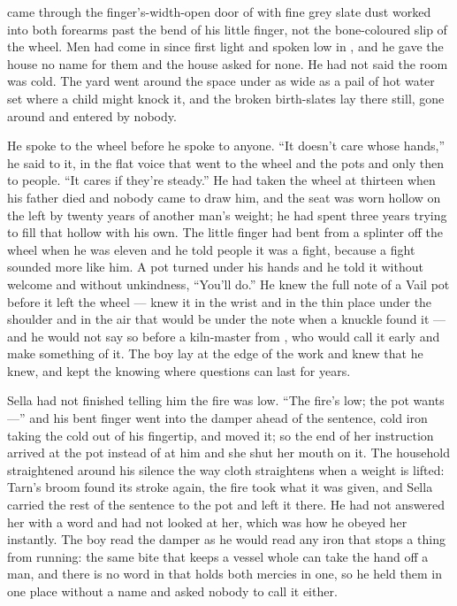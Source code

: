 \scenebreak

 came through the finger’s-width-open door of  with fine grey slate dust worked into both forearms past the bend of his little finger, not the bone-coloured slip of the wheel. Men had come in since first light and spoken low in , and he gave the house no name for them and the house asked for none. He had not said the room was cold. The yard went around the space under  as wide as a pail of hot water set where a child might knock it, and the broken birth-slates lay there still, gone around and entered by nobody.

He spoke to the wheel before he spoke to anyone. “It doesn’t care whose hands,” he said to it, in the flat voice that went to the wheel and the pots and only then to people. “It cares if they’re steady.” He had taken the wheel at thirteen when his father died and nobody came to draw him, and the seat was worn hollow on the left by twenty years of another man’s weight; he had spent three years trying to fill that hollow with his own. The little finger had bent from a splinter off the wheel when he was eleven and he told people it was a fight, because a fight sounded more like him. A pot turned under his hands and he told it without welcome and without unkindness, “You’ll do.” He knew the full note of a Vail pot before it left the wheel — knew it in the wrist and in the thin place under the shoulder and in the air that would be under the note when a knuckle found it — and he would not say so before a kiln-master from , who would call it early and make something of it. The boy lay at the edge of the work and knew that he knew, and kept the knowing where questions can last for years.

Sella had not finished telling him the fire was low. “The fire’s low; the pot wants ---” and his bent finger went into the damper ahead of the sentence, cold iron taking the cold out of his fingertip, and moved it; so the end of her instruction arrived at the pot instead of at him and she shut her mouth on it. The household straightened around his silence the way cloth straightens when a weight is lifted: Tarn’s broom found its stroke again, the fire took what it was given, and Sella carried the rest of the sentence to the pot and left it there. He had not answered her with a word and had not looked at her, which was how he obeyed her instantly. The boy read the damper as he would read any iron that stops a thing from running: the same bite that keeps a vessel whole can take the hand off a man, and there is no word in  that holds both mercies in one, so he held them in one place without a name and asked nobody to call it either.

